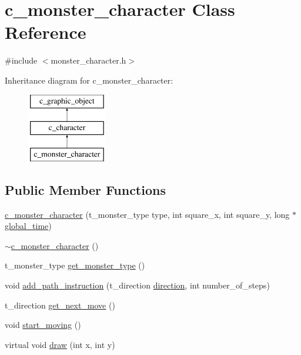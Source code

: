 \hypertarget{classc__monster__character}{\section{c\-\_\-monster\-\_\-character Class Reference}
\label{classc__monster__character}
}


{\ttfamily \#include $<$monster\-\_\-character.\-h$>$}

Inheritance diagram for c\-\_\-monster\-\_\-character\-:\begin{figure}[H]
\begin{center}
\leavevmode
\includegraphics[height=3.000000cm]{classc__monster__character}
\end{center}
\end{figure}
\subsection*{Public Member Functions}
\begin{DoxyCompactItemize}
\item 
\hyperlink{classc__monster__character_aa2c75305c0f964c08d92bbf9af37d055}{c\-\_\-monster\-\_\-character} (t\-\_\-monster\-\_\-type type, int square\-\_\-x, int square\-\_\-y, long $\ast$\hyperlink{classc__graphic__object_a9ff91aa7a60272a8f713ff011a0cc0bb}{global\-\_\-time})
\item 
\hyperlink{classc__monster__character_ae71c6e9894ba46d21f14730e018aa0a9}{$\sim$c\-\_\-monster\-\_\-character} ()
\item 
t\-\_\-monster\-\_\-type \hyperlink{classc__monster__character_a1e60ad834fcdb5cf8c5dc68b708116a4}{get\-\_\-monster\-\_\-type} ()
\item 
void \hyperlink{classc__monster__character_a41087457a2b7222423fb6b222cc650bf}{add\-\_\-path\-\_\-instruction} (t\-\_\-direction \hyperlink{classc__character_a571f1ae6115d7e9fee3159c41fcf27e8}{direction}, int number\-\_\-of\-\_\-steps)
\item 
t\-\_\-direction \hyperlink{classc__monster__character_a07f29e8aae5420c20a706c5449bd22ae}{get\-\_\-next\-\_\-move} ()
\item 
void \hyperlink{classc__monster__character_ad70a99a00e0c7cd66955815a0eb2634b}{start\-\_\-moving} ()
\item 
virtual void \hyperlink{classc__monster__character_ac400987c335adde2454cab352a63d3d2}{draw} (int x, int y)
\end{DoxyCompactItemize}
